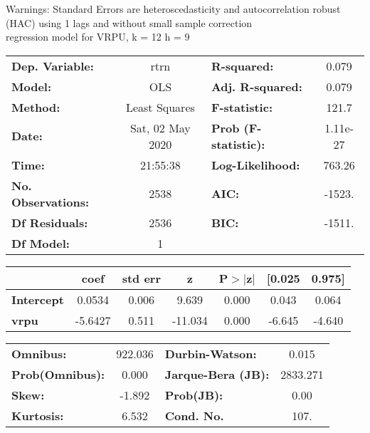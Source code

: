 Warnings: \newline
 [1] Standard Errors are heteroscedasticity and autocorrelation robust (HAC) using 1 lags and without small sample correction\\ 

regression model for VRPU, k = 12 h = 9\begin{center}
\begin{tabular}{lclc}
\toprule
\textbf{Dep. Variable:}    &       rtrn       & \textbf{  R-squared:         } &     0.079   \\
\textbf{Model:}            &       OLS        & \textbf{  Adj. R-squared:    } &     0.079   \\
\textbf{Method:}           &  Least Squares   & \textbf{  F-statistic:       } &     121.7   \\
\textbf{Date:}             & Sat, 02 May 2020 & \textbf{  Prob (F-statistic):} &  1.11e-27   \\
\textbf{Time:}             &     21:55:38     & \textbf{  Log-Likelihood:    } &    763.26   \\
\textbf{No. Observations:} &        2538      & \textbf{  AIC:               } &    -1523.   \\
\textbf{Df Residuals:}     &        2536      & \textbf{  BIC:               } &    -1511.   \\
\textbf{Df Model:}         &           1      & \textbf{                     } &             \\
\bottomrule
\end{tabular}
\begin{tabular}{lcccccc}
                   & \textbf{coef} & \textbf{std err} & \textbf{z} & \textbf{P$> |$z$|$} & \textbf{[0.025} & \textbf{0.975]}  \\
\midrule
\textbf{Intercept} &       0.0534  &        0.006     &     9.639  &         0.000        &        0.043    &        0.064     \\
\textbf{vrpu}      &      -5.6427  &        0.511     &   -11.034  &         0.000        &       -6.645    &       -4.640     \\
\bottomrule
\end{tabular}
\begin{tabular}{lclc}
\textbf{Omnibus:}       & 922.036 & \textbf{  Durbin-Watson:     } &    0.015  \\
\textbf{Prob(Omnibus):} &   0.000 & \textbf{  Jarque-Bera (JB):  } & 2833.271  \\
\textbf{Skew:}          &  -1.892 & \textbf{  Prob(JB):          } &     0.00  \\
\textbf{Kurtosis:}      &   6.532 & \textbf{  Cond. No.          } &     107.  \\
\bottomrule
\end{tabular}
\end{center}

